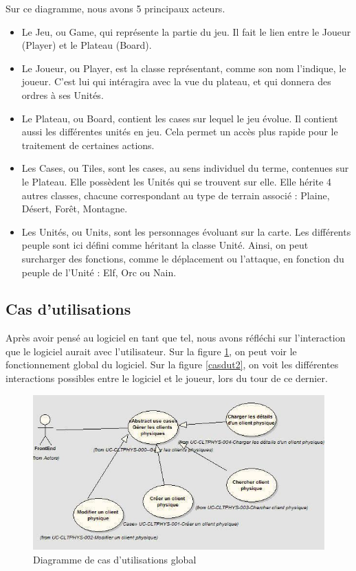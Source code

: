 Sur ce diagramme, nous avons 5 principaux acteurs.\\
\begin{itemize}
  \item Le Jeu, ou Game, qui représente la partie du jeu. Il fait le lien entre le Joueur (Player) et le Plateau (Board). 
  \item Le Joueur, ou Player, est la classe représentant, comme son nom l'indique, le joueur. C'est lui qui intéragira avec la vue du plateau, et qui donnera des ordres à ses Unités.
  \item Le Plateau, ou Board, contient les cases sur lequel le jeu évolue. Il contient aussi les différentes unités en jeu. Cela permet un accès plus rapide pour le traitement de certaines actions.
  \item Les Cases, ou Tiles, sont les cases, au sens individuel du terme, contenues sur le Plateau. Elle possèdent les Unités qui se trouvent sur elle. Elle hérite 4 autres classes, chacune correspondant au type de terrain associé : Plaine, Désert, Forêt, Montagne.
  \item Les Unités, ou Units, sont les personnages évoluant sur la carte. Les différents peuple sont ici défini comme héritant la classe Unité. Ainsi, on peut surcharger des fonctions, comme le déplacement ou l'attaque, en fonction du peuple de l'Unité : Elf, Orc ou Nain.
\end{itemize}

\subsection{Cas d'utilisations}
Après avoir pensé au logiciel en tant que tel, nous avons réfléchi sur l'interaction que le logiciel aurait avec l'utilisateur. Sur la figure \ref{casdut1}, on peut voir le fonctionnement global du logiciel. Sur la figure \ref{casdut2}, on voit les différentes interactions possibles entre le logiciel et le joueur, lors du tour de ce dernier. 

\begin{figure}[!h] 
\centerline{\includegraphics[scale=0.7]{img/diag_cas_dut_ex.jpeg}}
   \caption{\label{étiquette} Diagramme de cas d'utilisations global}
\label{casdut1}
\end{figure}


